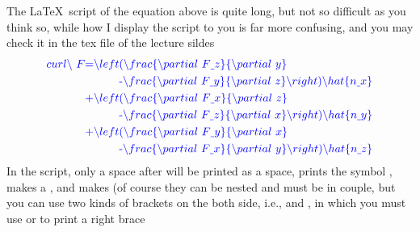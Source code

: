 \begin{frame}
	The \LaTeX\ script of the equation above is quite long, but not so difficult as you think so, while how I display the script to you is far more confusing, and you may check it in the tex file of the lecture sildes
	\begin{align*}
	\color{blue} curl\backslash\ F
	\text{=}\backslash left & \color{blue} (\backslash frac\{\backslash partial\ F\uline{\ }z\}\{\backslash partial\ y\}\\
	& \color{blue} \text{-}\backslash frac\{\backslash partial\ F\uline{\ }y\}\{\backslash partial\ z\}\backslash right)\backslash hat\{n\uline{\ }x\}\\
	\color{blue} \text{+}\backslash left & \color{blue} (\backslash frac\{\backslash partial\ F\uline{\ }x\}\{\backslash partial\ z\}\\
	& \color{blue} \text{-}\backslash frac\{\backslash partial\ F\uline{\ }z\}\{\backslash partial\ x\}\backslash right)\backslash hat\{n\uline{\ }y\}\\
	\color{blue} \text{+}\backslash left & \color{blue} (\backslash frac\{\backslash partial\ F\uline{\ }y\}\{\backslash partial\ x\}\\
	& \color{blue} \text{-}\backslash frac\{\backslash partial\ F\uline{\ }x\}\{\backslash partial\ y\}\backslash right)\backslash hat\{n\uline{\ }z\}
	\end{align*}
	In the script, only a space after \structure{\textbackslash} will be printed as a space,  prints the symbol \structure{$\partial$},  makes a ,  and  makes  (of course they can be nested and must be in couple, but you can use two kinds of brackets on the both side, i.e., \structure{\textbackslash left[} and , in which you must use  or \structure{\textbackslash \}} to print a right brace \structure{$\rbrace$} \\
\end{frame}

